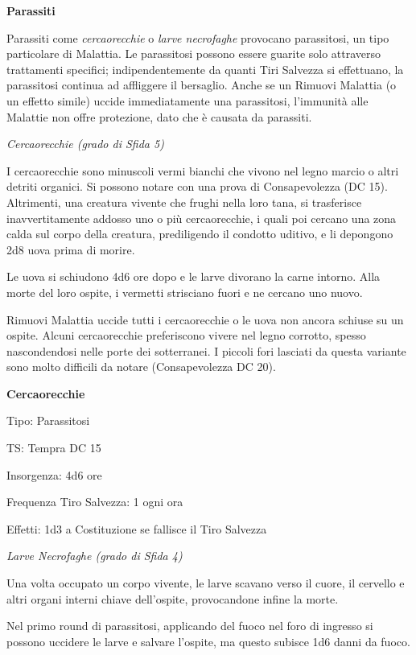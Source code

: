 \begin{multicols}{2}
\medskip
\textbf{Parassiti}

Parassiti come \emph{cercaorecchie} o \emph{larve necrofaghe} provocano parassitosi, un tipo particolare di Malattia. Le parassitosi possono essere guarite solo attraverso trattamenti specifici; indipendentemente da quanti Tiri Salvezza si effettuano, la parassitosi continua ad affliggere il bersaglio. Anche se un Rimuovi Malattia (o un effetto simile) uccide immediatamente una parassitosi, l'immunità alle Malattie non offre protezione, dato che è causata da parassiti.

\medskip
\noindent\emph{Cercaorecchie (grado di Sfida 5)}

I cercaorecchie sono minuscoli vermi bianchi che vivono nel legno marcio o altri detriti organici. Si possono notare con una prova di Consapevolezza (DC 15). Altrimenti, una creatura vivente che frughi nella loro tana, si trasferisce inavvertitamente addosso uno o più cercaorecchie, i quali poi cercano una zona calda sul corpo della creatura, prediligendo il condotto uditivo, e li depongono 2d8 uova prima di morire.

Le uova si schiudono 4d6 ore dopo e le larve divorano la carne intorno. Alla morte del loro ospite, i vermetti strisciano fuori e ne cercano uno nuovo.

Rimuovi Malattia uccide tutti i cercaorecchie o le uova non ancora schiuse su un ospite. Alcuni cercaorecchie preferiscono vivere nel legno corrotto, spesso nascondendosi nelle porte dei sotterranei. I piccoli fori lasciati da questa variante sono molto difficili da notare (Consapevolezza DC 20).

\medskip
\textbf{Cercaorecchie}

Tipo: Parassitosi

TS: Tempra DC 15

Insorgenza: 4d6 ore

Frequenza Tiro Salvezza: 1 ogni ora

Effetti: 1d3 a Costituzione se fallisce il Tiro Salvezza

\medskip
\noindent\emph{Larve Necrofaghe (grado di Sfida 4)}

Una volta occupato un corpo vivente, le larve scavano verso il cuore, il cervello e altri organi interni chiave dell'ospite, provocandone infine la morte.

Nel primo round di parassitosi, applicando del fuoco nel foro di ingresso si possono uccidere le larve e salvare l'ospite, ma questo subisce 1d6 danni da fuoco.


\end{multicols}
